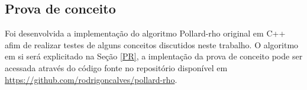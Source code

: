 

%
%
\subsection{Prova de conceito}
Foi desenvolvida a implementação do algoritmo Pollard-rho original em C++ afim de realizar testes de alguns conceitos discutidos neste trabalho. O algoritmo em si será explicitado na Seção \ref{PR}, a implentação da prova de conceito pode ser acessada através do código fonte no repositório disponível em \url{https://github.com/rodrigoncalves/pollard-rho}.
